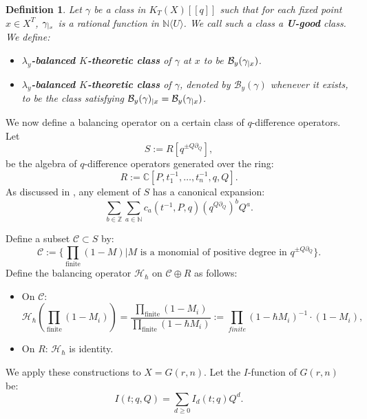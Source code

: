 \documentclass{amsart}
\newtheorem{definition}{Definition}
\begin{document}
\begin{definition}
Let $\gamma$  be a class in  $K_{T}(X)[[q]]$ such that for each fixed point $x \in X^T$, $\gamma_{\arrowvert_x}$ is a rational function in $\mathbb{N}\langle U\rangle$. We call such a class a \textbf{U-good} class. We define:
\begin{itemize}
    \item {\bf $\lambda_y$-balanced $K$-theoretic class} of $\gamma$ at $x$ to be $\mathcal{B}_y(\gamma_{{\arrowvert}x})$.
    \item {\bf $\lambda_y$-balanced $K$-theoretic class} of $\gamma$, denoted by $\mathcal{B}_y(\gamma)$ whenever it exists, to be the class satisfying $\mathcal{B}_y(\gamma)_{{\arrowvert}x} = \mathcal{B}_y(\gamma_{{\arrowvert}x})$.
\end{itemize}
\end{definition}
  

 We now define a balancing operator on a certain class of $q$-difference operators. Let
 \[
 S:=R[q^{\pm Q \partial_{Q}}],
 \]
 be the algebra of $q$-difference operators generated over the ring:
 \[
 R :=\mathbb{C}[P, t_1^{-1},\dots,t_n^{-1},q,Q].
 \]
 As discussed in , any element of $S$ has a canonical expansion:
 \[
       \sum_{b \in \mathbb{Z}}\sum_{a \in \mathbb{N}} c_a(t^{-1}, P,q)(q^{Q \partial_{Q}})^{b}Q^a.
\]

 Define a subset $\mathcal{C} \subset S$
        by:
        \[
        \mathcal{C}:=\Big\{\prod_{\text{finite}}(1-M) \Big| \text{$M$ is a monomial of positive degree in $q^{\pm Q \partial_{Q}}$}   \Big\}.
        \]
        Define the balancing operator $\mathcal{H}_{\hbar}$ on $\mathcal{C} \oplus R$ as follows:
        \begin{itemize}
            \item On $\mathcal{C}$:
         \begin{equation*}
          \mathcal{H}_{\hbar}\left(\prod_{\text{finite}}(1-M_i)\right) = \frac{\prod_{\text{finite}}(1-M_i)}{\prod_{\text{finite}}(1-\hbar M_i)} := \prod_{finite}(1-\hbar M_i)^{-1}\cdot(1-M_i),
       \end{equation*}
       \item On $R$: $\mathcal{H}_{\hbar}$  is identity.
 \end{itemize}

  We apply these constructions to $X = G(r,n)$. Let the $I$-function of $G(r,n)$ be:
\begin{equation} \label{intro}
I(t;q,Q) = \sum_{d \geq 0} I_d(t;q) Q^d.
\end{equation}
\end{document}
